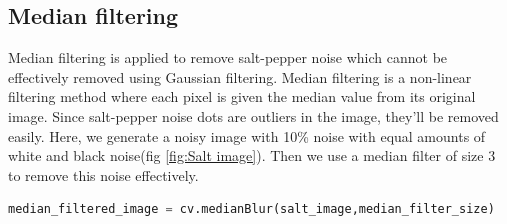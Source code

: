 \documentclass[11pt, a4paper]{article}
\begin{document}
\subsection{Median filtering}
Median filtering is applied to remove salt-pepper noise which cannot be effectively removed using Gaussian filtering. Median filtering is a non-linear filtering method where each pixel is given the median value from its original image. Since salt-pepper noise dots are outliers in the image, they'll be removed easily. Here, we generate a noisy image with 10\% noise with equal amounts of white and black noise(fig \ref{fig:Salt image}). Then we use a median filter of size 3 to remove this noise effectively.
\begin{lstlisting}[language=python]
median_filtered_image = cv.medianBlur(salt_image,median_filter_size)
\end{lstlisting}
\end{document}
